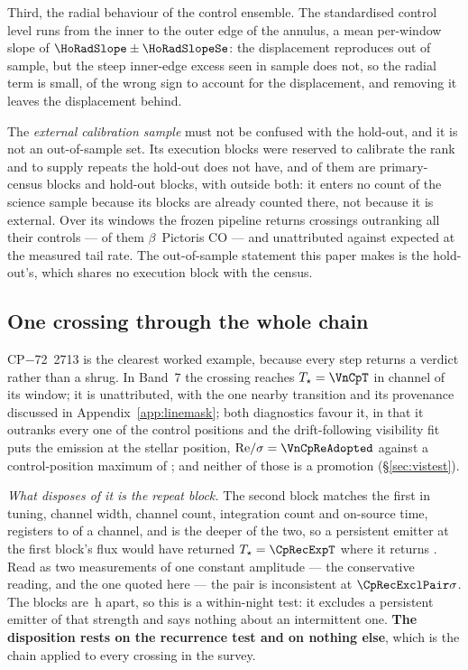 Third, the radial behaviour of the control ensemble. The standardised
control level runs \HoRadBins{} from the inner to the outer edge of the
annulus, a mean per-window slope of $\HoRadSlope\pm\HoRadSlopeSe$: the
displacement reproduces out of sample, but the steep inner-edge excess seen
in sample does not, so the radial term is small, of the wrong sign to account
for the displacement, and removing it leaves the displacement behind.

The \emph{external calibration sample} must not be confused with the
hold-out, and it is not an out-of-sample set. Its \CampBlocks{} execution
blocks were reserved to calibrate the rank and to supply repeats the hold-out
does not have, and \CalNCensus{} of them are primary-census blocks and
\CalNHoldout{} hold-out blocks, with \CalNOutside{} outside both: it enters no
count of the science sample because its blocks are already counted there, not
because it is external. Over its \CampWindows{} windows the frozen pipeline
returns \CampStageOne{} crossings outranking all their controls ---
\CampStageOneCO{} of them $\beta$~Pictoris CO --- and \CampUnattrib{}
unattributed against \CampExpUn{} expected at the measured tail rate. The
out-of-sample statement this paper makes is the hold-out's, which shares no
execution block with the census.

\subsection{One crossing through the whole chain}

CP$-$72~2713 is the clearest worked example, because every step returns a
verdict rather than a shrug. In Band~7 the crossing reaches
$T_\star=\VnCpT$ in channel \VnCpChan{} of its window; it is unattributed,
with the one nearby transition and its provenance discussed in
Appendix~\ref{app:linemask}; both diagnostics favour it, in that it outranks
every one of the \NCtrl{} control positions and the drift-following
visibility fit puts the emission at the stellar position, ${\rm
Re}/\sigma=\VnCpReAdopted$ against a control-position maximum of
\VnCpCtrlAdopted; and neither of those is a promotion
(\S\ref{sec:vistest}).

\emph{What disposes of it is the repeat block.} The second block matches the
first in tuning, channel width, channel count, integration count and
on-source time, registers to \CpRecOffChan{} of a channel, and is the deeper
of the two, so a persistent emitter at the first block's flux would have
returned $T_\star=\CpRecExpT$ where it returns \CpRecT. Read as two
measurements of one constant amplitude --- the conservative reading, and the
one quoted here --- the pair is inconsistent at $\CpRecExclPair\sigma$. The
blocks are \CpSepH\,h apart, so this is a within-night test: it excludes a
persistent emitter of that strength and says nothing about an intermittent
one. \textbf{The disposition rests on the recurrence test and on nothing
else}, which is the chain applied to every crossing in the survey.


